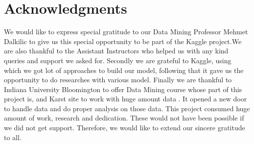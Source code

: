 \documentclass[fleqn,10pt]{SelfArx} %
\begin{document}
\section*{Acknowledgments} %
We would like to express special gratitude to our Data Mining Professor Mehmet Dalkilic to give us this special opportunity to be part of the Kaggle project.We are also thankful to the Assistant Instructors who helped us with any kind queries and support we asked for. Secondly we are grateful to Kaggle, using which we got lot of approaches to build our model, following that it gave us the opportunity to do researches with various model. Finally we are thankful to Indiana University Bloomington to offer  Data Mining course whose part of this project is, and Karst site to work with huge amount data . It opened a new door to handle data and do proper analysis on those data. This project consumed huge amount of work, research and dedication. These would not have been possible if we did not get support. Therefore, we would like to extend our sincere gratitude to all.

 



\end{document}
